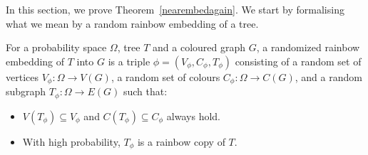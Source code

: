 
In this section, we prove Theorem~\ref{nearembedagain}. We start by formalising what we mean by a random rainbow embedding of a tree.
\begin{definition}
For a probability space $\Omega$, tree $T$ and a coloured graph $G$, a randomized rainbow  embedding of $T$ into $G$ is
a triple $\phi=(V_\phi, C_\phi, T_\phi)$ consisting of a random set of vertices $V_\phi:\Omega\to V(G)$, a random set of colours $C_\phi:\Omega\to C(G)$, and a random subgraph $T_\phi:\Omega\to E(G)$ such that:
\begin{itemize}
\item $V(T_\phi)\subseteq V_\phi$ and $C(T_\phi)\subseteq C_\phi$ always hold.
\item With high probability, $T_\phi$ is a rainbow copy of $T$.
\end{itemize}
\end{definition}

